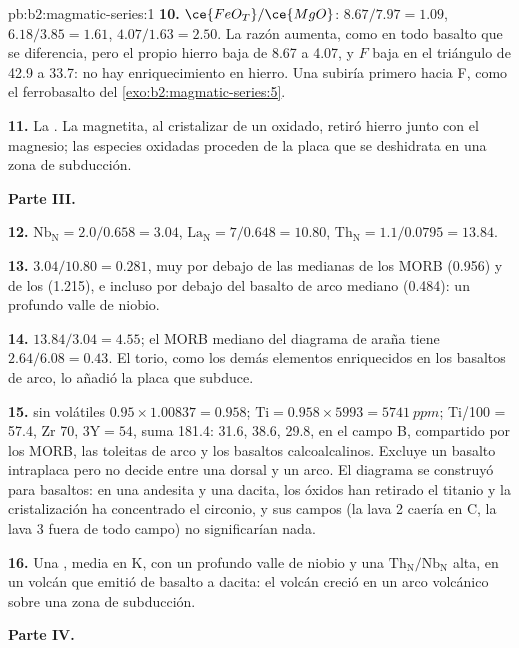 \begin{solution}{pb:b2:magmatic-series:1}
\textbf{10.} $\ce{FeO_T}/\ce{MgO}$: $8.67/7.97 = 1.09$, $6.18/3.85 = 1.61$, $4.07/1.63 =
2.50$. La razón aumenta, como en todo basalto que se diferencia, pero el propio hierro
baja de 8.67 a 4.07, y $F$ baja en el triángulo de 42.9 a 33.7: no hay enriquecimiento
en hierro. Una  subiría primero hacia F, como el ferrobasalto del
\cref{exo:b2:magmatic-series:5}.

\textbf{11.} La . La magnetita, al cristalizar de un  oxidado,
retiró hierro junto con el magnesio; las especies oxidadas proceden de la placa que se deshidrata en una
zona de subducción.

\noindent\textbf{Parte III.}

\textbf{12.} $\mathrm{Nb_N} = 2.0/0.658 = 3.04$, $\mathrm{La_N} = 7/0.648 = 10.80$,
$\mathrm{Th_N} = 1.1/0.0795 = 13.84$.

\textbf{13.} $3.04/10.80 = 0.281$, muy por debajo de las medianas de los MORB (0.956) y de los
 (1.215), e incluso por debajo del basalto de arco mediano (0.484): un profundo
valle de niobio.

\textbf{14.} $13.84/3.04 = 4.55$; el MORB mediano del diagrama de araña tiene $2.64/6.08 =
0.43$. El torio, como los demás elementos enriquecidos en los basaltos de arco, lo añadió la
placa que subduce.

\textbf{15.}  sin volátiles $0.95\times1.00837 = 0.958$; $\mathrm{Ti} =
0.958\times5993 = \qty{5741}{ppm}$; Ti/100 = 57.4, Zr 70, $3\mathrm Y = 54$, suma 181.4:
31.6, 38.6, 29.8, en el campo B, compartido por los MORB, las toleitas de arco y los basaltos calcoalcalinos.
Excluye un basalto intraplaca pero no decide entre una dorsal y un arco. El
diagrama se construyó para basaltos: en una andesita y una dacita, los óxidos han retirado el titanio
y la cristalización ha concentrado el circonio, y sus campos (la lava 2
caería en C, la lava 3 fuera de todo campo) no significarían nada.

\textbf{16.} Una , media en K, con un profundo valle de niobio y una
$\mathrm{Th_N}/\mathrm{Nb_N}$ alta, en un volcán que emitió de basalto a dacita: el volcán
creció en un arco volcánico sobre una zona de subducción.

\noindent\textbf{Parte IV.}


\end{solution}
